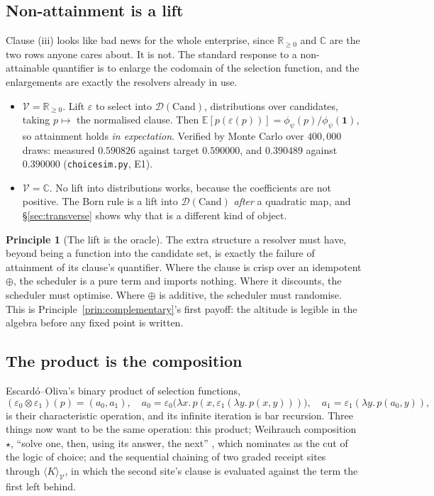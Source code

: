 \documentclass[11pt]{article}
\theoremstyle{definition}
\newtheorem{principle}{Principle}
\theoremstyle{plain}
\theoremstyle{remark}
\newcommand{\V}{\mathcal{V}}
\newcommand{\sumv}{\oplus}
\newcommand{\tensorv}{\otimes}
\newcommand{\Rnn}{\mathbb{R}_{\geq 0}}
\newcommand{\Cx}{\mathbb{C}}
\newcommand{\Cand}{\mathrm{Cand}}
\newcommand{\Wstar}{\star}
\begin{document}
\subsection{Non-attainment is a lift}\label{ssec:lift}

Clause (iii) looks like bad news for the whole enterprise, since $\Rnn$ and $\Cx$ are
the two rows anyone cares about. It is not. The standard response to a non-attainable
quantifier is to enlarge the codomain of the selection function, and the enlargements
are exactly the resolvers already in use.

\begin{itemize}[leftmargin=1.4em,itemsep=2pt]
\item $\V = \Rnn$. Lift $\varepsilon$ to select into $\mathcal{D}(\Cand)$,
distributions over candidates, taking $p \mapsto$ the normalised clause. Then
$\mathbb{E}[p(\varepsilon(p))] = \phi_\psi(p) / \phi_\psi(\mathbf{1})$, so attainment
holds \emph{in expectation}. Verified by Monte Carlo over $400{,}000$ draws: measured
$0.590826$ against target $0.590000$, and $0.390489$ against $0.390000$
(\texttt{choicesim.py}, E1).
\item $\V = \Cx$. No lift into distributions works, because the coefficients are not
positive. The Born rule is a lift into $\mathcal{D}(\Cand)$ \emph{after} a quadratic
map, and \S\ref{sec:transverse} shows why that is a different kind of object.
\end{itemize}

\begin{principle}[The lift is the oracle]\label{prin:lift}
The extra structure a resolver must have, beyond being a function into the candidate
set, is exactly the failure of attainment of its clause's quantifier. Where the clause
is crisp over an idempotent $\sumv$, the scheduler is a pure term and imports nothing.
Where it discounts, the scheduler must optimise. Where $\sumv$ is additive, the
scheduler must randomise. This is Principle~\ref{prin:complementary}'s first payoff:
the altitude is legible in the algebra before any fixed point is written.
\end{principle}

\subsection{The product is the composition}\label{ssec:product}

Escard\'o--Oliva's binary product of selection functions,
\[
  (\varepsilon_0 \tensorv \varepsilon_1)(p) = (a_0, a_1), \quad
  a_0 = \varepsilon_0\big(\lambda x.\, p(x, \varepsilon_1(\lambda y.\,p(x,y)))\big),
  \quad a_1 = \varepsilon_1(\lambda y.\, p(a_0,y)),
\]
is their characteristic operation, and its infinite iteration is bar recursion. Three
things now want to be the same operation: this product; Weihrauch composition
$\Wstar$, ``solve one, then, using its answer, the next'' \cite{weihrauch}, which
\cite{choicesched} nominates as the cut of the logic of choice; and the sequential
chaining of two graded receipt sites through $\langle K \rangle_\V$, in which the
second site's clause is evaluated against the term the first left behind.
\end{document}
